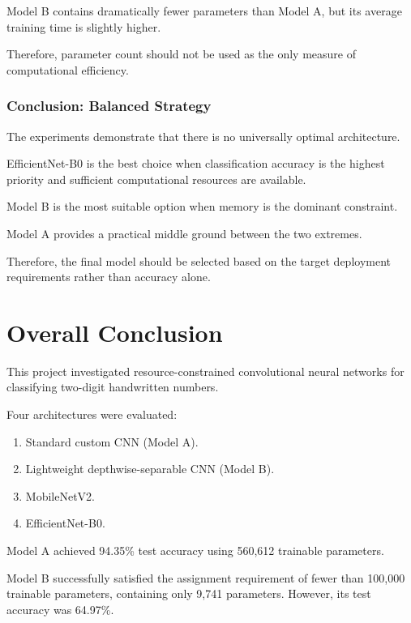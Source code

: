 \documentclass[12pt,a4paper]{report}
\begin{document}
Model B contains dramatically fewer parameters than Model A,
but its average training time is slightly higher.

Therefore, parameter count should not be used as the only measure
of computational efficiency.

\subsection{Conclusion: Balanced Strategy}

The experiments demonstrate that there is no universally optimal
architecture.

EfficientNet-B0 is the best choice when classification accuracy
is the highest priority and sufficient computational resources
are available.

Model B is the most suitable option when memory is the dominant
constraint.

Model A provides a practical middle ground between the two
extremes.

Therefore, the final model should be selected based on the target
deployment requirements rather than accuracy alone.



\chapter{Overall Conclusion}

This project investigated resource-constrained convolutional
neural networks for classifying two-digit handwritten numbers.

Four architectures were evaluated:

\begin{enumerate}
    \item Standard custom CNN (Model A).
    \item Lightweight depthwise-separable CNN (Model B).
    \item MobileNetV2.
    \item EfficientNet-B0.
\end{enumerate}

Model A achieved 94.35\% test accuracy using 560,612 trainable
parameters.

Model B successfully satisfied the assignment requirement of
fewer than 100,000 trainable parameters, containing only 9,741
parameters. However, its test accuracy was 64.97\%.
\end{document}

